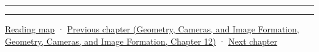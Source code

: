 \begin{center}\rule{0.5\linewidth}{0.5pt}\end{center}

\begin{center}\rule{0.5\linewidth}{0.5pt}\end{center}

\hyperref[volume-reading-map]{Reading map} · \href{../03-Geometry-Cameras-and-Image-Formation/main.pdf\#nameddest=03-visual-computing-i-ch013-from-view-space-to-clip-space}{Previous chapter (Geometry, Cameras, and Image Formation, Geometry, Cameras, and Image Formation, Chapter 12)} · \hyperref[03-visual-computing-i-ch015-rasterization-foundations-and-renderer-evidence]{Next chapter}
